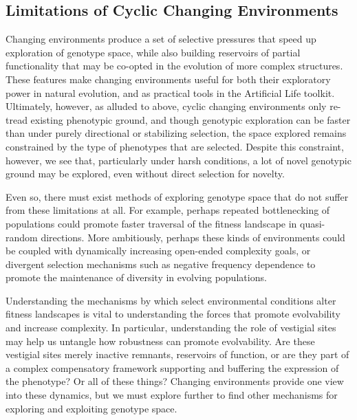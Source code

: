\documentclass[10pt,letterpaper]{article}
\begin{document}
\subsection*{Limitations of Cyclic Changing Environments}
Changing environments produce a set of selective pressures that speed up exploration of genotype space, while also building reservoirs of partial functionality that may be co-opted in the evolution of more complex structures. These features make changing environments useful for both their exploratory power in natural evolution, and as practical tools in the Artificial Life toolkit.
Ultimately, however, as alluded to above, cyclic changing environments only re-tread existing phenotypic ground, and though genotypic exploration can be faster than under purely directional or stabilizing selection, the space explored remains constrained by the type of phenotypes that are selected. Despite this constraint, however, we see that, particularly under harsh conditions, a lot of novel genotypic ground may be explored, even without direct selection for novelty. 

Even so, there must exist methods of exploring genotype space that do not suffer from these limitations at all.
For example, perhaps repeated bottlenecking of populations could promote faster traversal of the fitness landscape in quasi-random directions. More ambitiously, perhaps these kinds of environments could be coupled with dynamically increasing open-ended complexity goals, or divergent selection mechanisms such as negative frequency dependence to promote the maintenance of diversity in evolving populations.

Understanding the mechanisms by which select environmental conditions alter fitness landscapes is vital to understanding the forces that promote evolvability and increase complexity. In particular, understanding the role of vestigial sites may help us untangle how robustness can promote evolvability. Are these vestigial sites merely inactive remnants, reservoirs of function, or are they part of a complex compensatory framework supporting and buffering the expression of the phenotype? Or all of these things? Changing environments provide one view into these dynamics, but we must explore further to find other mechanisms for exploring and exploiting genotype space.
\end{document}
